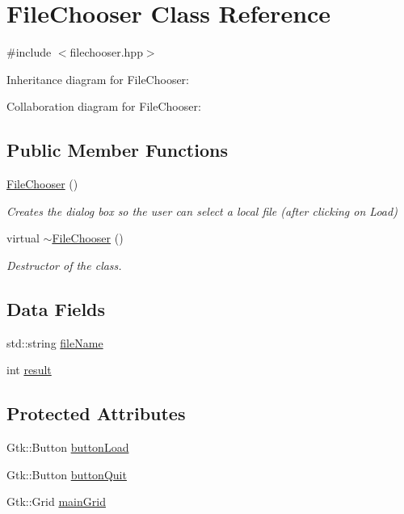 \hypertarget{class_file_chooser}{}\section{File\+Chooser Class Reference}
\label{class_file_chooser}


{\ttfamily \#include $<$filechooser.\+hpp$>$}



Inheritance diagram for File\+Chooser\+:


Collaboration diagram for File\+Chooser\+:
\subsection*{Public Member Functions}
\begin{DoxyCompactItemize}
\item 
\hyperlink{class_file_chooser_a566dad72c6724bc2d4970361758d66c5}{File\+Chooser} ()
\begin{DoxyCompactList}\small\item\em Creates the dialog box so the user can select a local file (after clicking on \textquotesingle{}Load\textquotesingle{}) \end{DoxyCompactList}\item 
virtual \hyperlink{class_file_chooser_a67c94ae24fad94cf464d1283f33175d4}{$\sim$\+File\+Chooser} ()
\begin{DoxyCompactList}\small\item\em Destructor of the class. \end{DoxyCompactList}\end{DoxyCompactItemize}
\subsection*{Data Fields}
\begin{DoxyCompactItemize}
\item 
std\+::string \hyperlink{class_file_chooser_a1d086cbbd2700e5fe9e143c505b205c8}{file\+Name}
\item 
int \hyperlink{class_file_chooser_a7651bd1362ed109c0ac323d8ab41b254}{result}
\end{DoxyCompactItemize}
\subsection*{Protected Attributes}
\begin{DoxyCompactItemize}
\item 
Gtk\+::\+Button \hyperlink{class_file_chooser_a8a482acec202e153b7764e7942d1895b}{button\+Load}
\item 
Gtk\+::\+Button \hyperlink{class_file_chooser_ac7ff53b66e963e4478cecea22de7331c}{button\+Quit}
\item 
Gtk\+::\+Grid \hyperlink{class_file_chooser_ad4533e29ed9c3dc3bd3d48c513688abb}{main\+Grid}
\end{DoxyCompactItemize}


